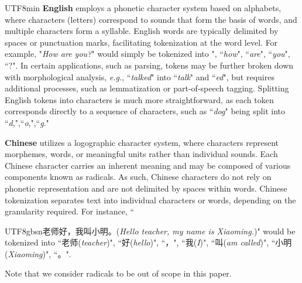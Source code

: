 \documentclass{article}
\theoremstyle{plain}
\theoremstyle{definition}
\theoremstyle{remark}
\begin{document}
\begin{CJK}{UTF8}{min}
\textbf{English} employs a phonetic character system based on alphabets, where characters (letters) correspond to sounds that form the basis of words, and multiple characters form a syllable. English words are typically delimited by spaces or punctuation marks, facilitating tokenization at the word level. For example, "\textit{How are you?}" would simply be tokenized into ", ``\textit{how}", ``\textit{are}", ``\textit{you}", ``?". In certain applications, such as parsing, tokens may be further broken down with morphological analysis, \textit{e.g.}, ``\textit{talked}" into ``\textit{talk}" and ``\textit{ed}", but requires additional processes, such as lemmatization or part-of-speech tagging. Splitting English tokens into characters is much more straightforward, as each token corresponds directly to a sequence of characters, such as ``\textit{dog}" being split into ``\textit{d},",``\textit{o},",``\textit{g}."

\textbf{Chinese} utilizes a logographic character system, where characters represent morphemes, words, or meaningful units rather than individual sounds. Each Chinese character carries an inherent meaning and may be composed of various components known as radicals. As such, Chinese characters do not rely on phonetic representation and are not delimited by spaces within words. Chinese tokenization separates text into individual characters or words, depending on the granularity required. For instance, ``\begin{CJK*}{UTF8}{gbsn}老师好，我叫小明。(\textit{Hello teacher, my name is Xiaoming.})" would be tokenized into ``老师(\textit{teacher})", ``好(\textit{hello})", ``，", ``我(\textit{I})", ``叫(\textit{am called})", ``小明(\textit{Xiaoming})", ``。".\end{CJK*} Note that we consider radicals to be out of scope in this paper.


\end{CJK}
\end{document}
